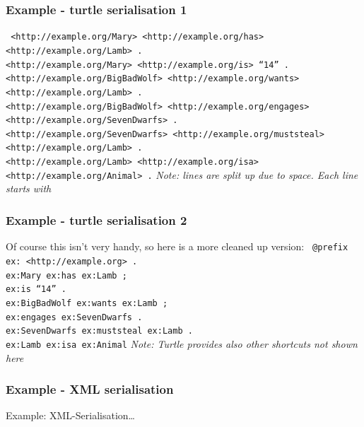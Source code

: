 \documentclass[handout]{beamer}
\begin{document}
       \begin{frame}
           \frametitle{Example - turtle serialisation 1}
           \footnotesize
           \texttt{ <http://example.org/Mary>    <http://example.org/has>    <http://example.org/Lamb>  .\\
            <http://example.org/Mary>    <http://example.org/is>     ``14''  .\\
            <http://example.org/BigBadWolf>    <http://example.org/wants>   <http://example.org/Lamb>  .\\
            <http://example.org/BigBadWolf>    <http://example.org/engages>    <http://example.org/SevenDwarfs>  .\\
            <http://example.org/SevenDwarfs>    <http://example.org/muststeal>    <http://example.org/Lamb>  .\\
            <http://example.org/Lamb>    <http://example.org/isa>    <http://example.org/Animal>  .}
           \normalsize
           \vskip 0.7cm
           \textit{Note: lines are split up due to space. Each line starts with }
       \end{frame}

       \begin{frame}
           \frametitle{Example - turtle serialisation 2}
           Of course this isn't very handy, so here is a more cleaned up version:
           \footnotesize
           \vskip 0.7cm
           \texttt{ @prefix ex: <http://example.org> . \\
            ex:Mary          ex:has          ex:Lamb ; \\
                             ex:is           ``14''  . \\
            ex:BigBadWolf    ex:wants        ex:Lamb ; \\
                             ex:engages      ex:SevenDwarfs  . \\           
            ex:SevenDwarfs   ex:muststeal    ex:Lamb . \\
            ex:Lamb          ex:isa          ex:Animal}
           \normalsize
           \vskip 0.7cm
           \textit{Note: Turtle provides also other shortcuts not shown here}
       \end{frame}

       \begin{frame}
           \frametitle{Example - XML serialisation}
           \vskip 0.8cm
           Example: XML-Serialisation\ldots
       \end{frame}
 
\end{document}
